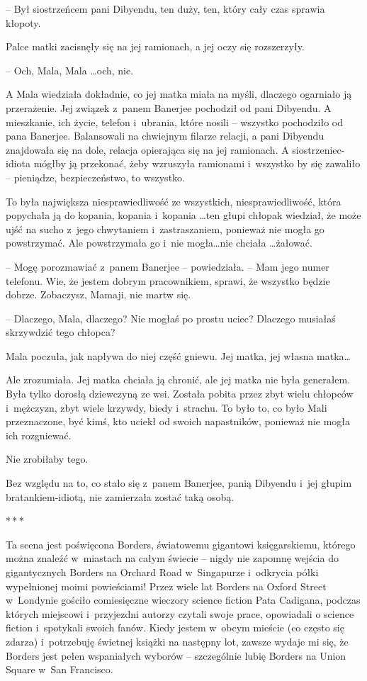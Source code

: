 \documentclass[oneside,polish,11pt,rmheadings]{mwbk}
\newcommand{\threeast}{\par\centerline{*\,*\,*}\medskip\par}
\begin{document}
-- Był siostrzeńcem pani Dibyendu, ten duży, ten, który cały czas sprawia kłopoty. 


Palce matki zacisnęły się na jej ramionach, a jej oczy się rozszerzyły. 


-- Och, Mala, Mala \ldots  och, nie. 


A Mala wiedziała dokładnie, co jej matka miała na myśli, dlaczego ogarniało ją przerażenie. Jej związek z~panem Banerjee pochodził od pani Dibyendu. A mieszkanie, ich życie, telefon i~ubrania, które nosili -- wszystko pochodziło od pana Banerjee. Balansowali na chwiejnym filarze relacji, a pani Dibyendu znajdowała się na dole, relacja opierająca się na jej ramionach. A siostrzeniec-idiota mógłby ją przekonać, żeby wzruszyła ramionami i~wszystko by się zawaliło -- pieniądze, bezpieczeństwo, to wszystko. 


To była największa niesprawiedliwość ze wszystkich, niesprawiedliwość, która popychała ją do kopania, kopania i~kopania \ldots  ten głupi chłopak wiedział, że może ujść na sucho z~jego chwytaniem i~zastraszaniem, ponieważ nie mogła go powstrzymać. Ale powstrzymała go i~nie mogła\ldots  nie chciała \ldots  żałować. 


-- Mogę porozmawiać z~panem Banerjee -- powiedziała. -- Mam jego numer telefonu. Wie, że jestem dobrym pracownikiem, sprawi, że wszystko będzie dobrze. Zobaczysz, Mamaji, nie martw się. 


-- Dlaczego, Mala, dlaczego? Nie mogłaś po prostu uciec? Dlaczego musiałaś skrzywdzić tego chłopca? 


Mala poczuła, jak napływa do niej część gniewu. Jej matka, jej własna matka\ldots  


Ale zrozumiała. Jej matka chciała ją chronić, ale jej matka nie była generałem. Była tylko dorosłą dziewczyną ze wsi. Została pobita przez zbyt wielu chłopców i~mężczyzn, zbyt wiele krzywdy, biedy i~strachu. To było to, co było Mali przeznaczone, być kimś, kto uciekł od swoich napastników, ponieważ nie mogła ich rozgniewać. 


Nie zrobiłaby tego. 


Bez względu na to, co stało się z~panem Banerjee, panią Dibyendu i~jej głupim bratankiem-idiotą, nie zamierzała zostać taką osobą. 


\bigskip
\threeast


Ta scena jest poświęcona Borders, światowemu gigantowi księgarskiemu, którego można znaleźć w~miastach na całym świecie -- nigdy nie zapomnę wejścia do gigantycznych Borders na Orchard Road w~Singapurze i~odkrycia półki wypełnionej moimi powieściami! Przez wiele lat Borders na Oxford Street w~Londynie gościło comiesięczne wieczory science fiction Pata Cadigana, podczas których miejscowi i~przyjezdni autorzy czytali swoje prace, opowiadali o science fiction i~spotykali swoich fanów. Kiedy jestem w~obcym mieście (co często się zdarza) i~potrzebuję świetnej książki na następny lot, zawsze wydaje mi się, że Borders jest pełen wspaniałych wyborów -- szczególnie lubię Borders na Union Square w~San Francisco. 
\end{document}
